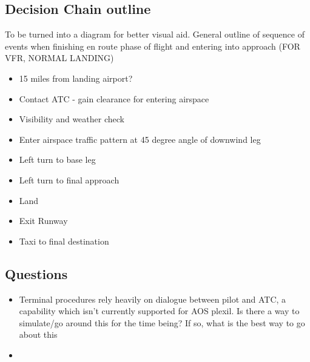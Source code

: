 \documentclass{article}
\begin{document}
\subsection{Decision Chain outline}

To be turned into a diagram for better visual aid.  General outline of sequence of events when finishing en route phase of flight and entering into approach (FOR VFR, NORMAL LANDING)

\begin{itemize}
\item 15 miles from landing airport?
\item Contact ATC - gain clearance for entering airspace
\item Visibility and weather check
\item Enter airspace traffic pattern at 45 degree angle of downwind leg
\item Left turn to base leg
\item Left turn to final approach
\item Land
\item Exit Runway
\item Taxi to final destination

\end{itemize}

\subsection{Questions}

\begin{itemize}
\item Terminal procedures rely heavily on dialogue between pilot and ATC, a capability which isn't currently supported for AOS plexil.  Is there a way to simulate/go around this for the time being?  If so, what is the best way to go about this
\item 
\end{itemize}
\end{document}
